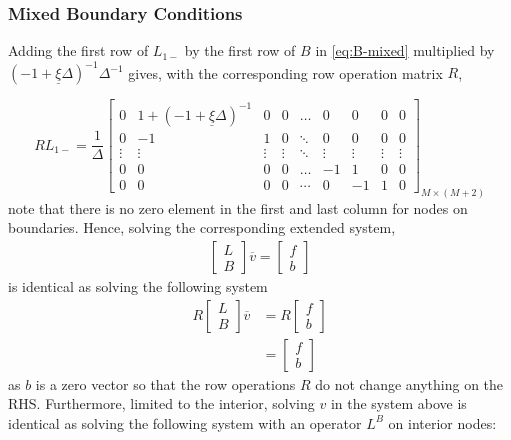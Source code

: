 \documentclass[11pt]{article}
\theoremstyle{definition}
\begin{document}
\subsubsection{Mixed Boundary Conditions}

Adding the first row of $L_{1-}$ by the first row of $B$ in \eqref{eq:B-mixed} multiplied by $(-1 + \underline{\xi} \Delta )^{-1}\Delta^{-1}$ gives, with the corresponding row operation matrix $R$,

\begin{equation}
R {L}_{1-} = \dfrac{1}{\Delta} \begin{bmatrix}
0&1 + (-1 + \underline{\xi}\Delta )^{-1}&0&0&\dots&0&0&0&0\\
0&-1&1&0&\ddots&0&0&0&0\\
\vdots&\vdots&\vdots&\vdots&\ddots&\vdots&\vdots&\vdots&\vdots\\
0&0&0&0&\dots&-1&1&0&0\\
0&0&0&0&\cdots&0&-1&1&0
\end{bmatrix}_{M\times (M+2)}
\end{equation}
note that there is no zero element in the first and last column for nodes on boundaries. Hence, solving the corresponding extended system,
\begin{align}
\begin{bmatrix}
{L}\\
B
\end{bmatrix} 
\overline{v} 
=
\begin{bmatrix}
f \\ b
\end{bmatrix}
\end{align}
is identical as solving the following system
\begin{align}
R
\begin{bmatrix}
{L}\\
B
\end{bmatrix} 
\overline{v} 
&=
R
\begin{bmatrix}
f \\ b
\end{bmatrix} \\
&= \begin{bmatrix}
f \\ b
\end{bmatrix}
\end{align}
as $b$ is a zero vector so that the row operations $R$ do not change anything on the RHS. Furthermore, limited to the interior, solving $v$ in the system above is identical as solving the following system with an operator $L^B$ on interior nodes:
\end{document}
